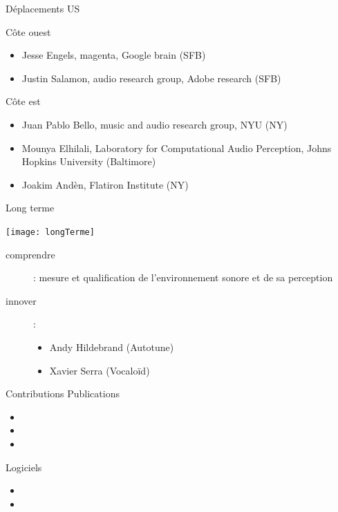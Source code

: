 \begin{frame}{Déplacements US}
\begin{block}{Côte ouest}
\begin{itemize}
\item Jesse Engels, magenta, Google brain (SFB)
\item Justin Salamon, audio research group, Adobe research (SFB)
\end{itemize}
\end{block}
\begin{block}{Côte est}
\begin{itemize}
\item Juan Pablo Bello, music and audio research group, NYU (NY) 
\item Mounya Elhilali, Laboratory for Computational Audio Perception, Johns Hopkins University (Baltimore)
\item Joakim Andèn, Flatiron Institute (NY)
\end{itemize}
\end{block}
\end{frame}

\begin{frame}{Long terme}
\begin{center}
 \texttt{[image: longTerme]}
\end{center}
\begin{description}
\item[comprendre] : mesure et qualification de l'environnement sonore et de sa perception
\item[innover] : 
\begin{itemize}
\item Andy Hildebrand (Autotune)
\item Xavier Serra (Vocaloïd)
\end{itemize}
\end{description}
\end{frame}

\begin{frame}{Contributions}
\small
Publications
\begin{itemize}
\item {}
\item {}
\item {}
\end{itemize}
Logiciels
\begin{itemize}
\item {}
\item {}
\end{itemize}
\end{frame}


